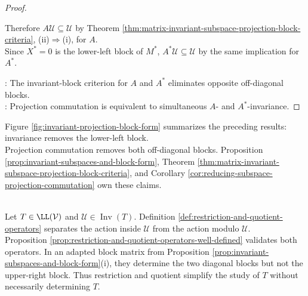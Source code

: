 \begin{corollary}
\begin{proof}
\begin{enumerate}[label=(\roman*)]
Therefore $A\mathcal{U}\subseteq\mathcal{U}$ by Theorem \ref{thm:matrix-invariant-subspace-projection-block-criteria}, (ii)$\Rightarrow$(i), for $A$.\\
Since $X^*=0$ is the lower-left block of $M^*$, $A^*\mathcal{U}\subseteq\mathcal{U}$ by the same implication for $A^*$.
\end{enumerate}
: The invariant-block criterion for $A$ and $A^*$ eliminates opposite off-diagonal blocks.\\
: Projection commutation is equivalent to simultaneous $A$- and $A^*$-invariance.
\end{proof}
\end{corollary}

Figure \ref{fig:invariant-projection-block-form} summarizes the preceding results: invariance removes the lower-left block.\\
Projection commutation removes both off-diagonal blocks. Proposition \ref{prop:invariant-subspaces-and-block-form}, Theorem \ref{thm:matrix-invariant-subspace-projection-block-criteria}, and Corollary \ref{cor:reducing-subspace-projection-commutation} own these claims.

\begin{illustrationfigure}[H]
  \centering
  
  \caption{Adapted coordinates represent invariance by upper block form and reduction by block diagonal form.}
  \label{fig:invariant-projection-block-form}
\end{illustrationfigure}

\begin{perspective} \label{per:restriction-quotient-perspective} \\
Let $T\in\LL(\mathcal{V})$ and $\mathcal{U}\in\operatorname{Inv}(T)$. Definition \ref{def:restriction-and-quotient-operators} separates the action inside $\mathcal{U}$ from the action modulo $\mathcal{U}$.\\
Proposition \ref{prop:restriction-and-quotient-operators-well-defined} validates both operators. In an adapted block matrix from Proposition \ref{prop:invariant-subspaces-and-block-form}(i), they determine the two diagonal blocks but not the upper-right block. Thus restriction and quotient simplify the study of $T$ without necessarily determining $T$.
\end{perspective}
